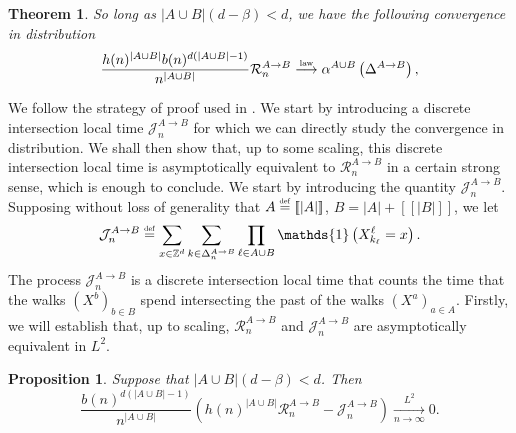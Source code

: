 \documentclass[10pt,a4paper]{amsart}
\newcommand{\R}{\mathcal R}
\newcommand{\J}{\mathcal J}
\newcommand{\1}{\mathds{1}}
\newcommand{\ZZ}{\mathbb Z}
\newcommand{\distribution}{\stackrel{\scaleto{\mathrm{law}}{4pt}}{\longrightarrow}}
\newcommand{\eqdef}{\stackrel{\scaleto{\mathrm{def}}{3.5pt}}{=}}
\newtheorem{theorem}{Theorem}
\newtheorem{proposition}{Proposition}
\numberwithin{equation}{section}
\begin{document}
\begin{theorem}
\label{theorem:convergence of R_n^(A->B)}
    So long as $|A\cup B|(d-\beta)<d$, we have the following convergence in distribution
    \begin{equation}
        \label{convergence:limit of R_n^(A->B)}
        \frac{h(n)^{|A\cup B|}b(n)^{d(|A\cup B|-1)}}{n^{|A\cup B|}}\mathcal R_n^{A\rightarrow B}\distribution \alpha^{A\cup B}\left(\Delta^{A\rightarrow B}\right),
    \end{equation}
\end{theorem}

We follow the strategy of proof used in \cite{LeGallRosenRangeOfStableRandomWalks1991}. We start by introducing a discrete intersection local time $\mathcal J_n^{A\rightarrow B}$ for which we can directly study the convergence in distribution. We shall then show that, up to some scaling, this discrete intersection local time is asymptotically equivalent to $\mathcal R_n^{A\rightarrow B}$ in a certain strong sense, which is enough to conclude. We start by introducing the quantity $\mathcal J_n^{A\rightarrow B}$. Supposing without loss of generality that $A\eqdef[\![|A|]\!]$, $B=|A|+[\![|B|]\!]$, we let
\begin{equation*}
    \mathcal J_n^{A\rightarrow B}\eqdef\sum_{x\in\ZZ^d}\sum_{k\in \Delta_n^{A\rightarrow B}}\prod_{\ell\in A\cup B}\1\left(X_{k_\ell}^{\ell}=x\right).
\end{equation*}
The process $\mathcal J_n^{A\rightarrow B}$ is a discrete intersection local time that counts the time that the walks $(X^b)_{b\in B}$ spend intersecting the past of the walks $(X^a)_{a\in A}$. Firstly, we will establish that, up to scaling, $\R_n^{A\rightarrow B}$ and $\J_n^{A\rightarrow B}$ are asymptotically equivalent in $L^2$.

\begin{proposition}
\label{proposition: h(n)^(a+b)R_n^(A->B) and J_n^(A->B) are close in L^2}
    Suppose that $|A\cup B|(d-\beta)<d$. Then
    \begin{equation*}
        \frac{b(n)^{d(|A\cup B|-1)}}{n^{|A\cup B|}}\left(h(n)^{|A\cup B|}\mathcal R_n^{A\rightarrow B}-\mathcal J_n^{A\rightarrow B}\right)\underset{n\rightarrow\infty}{\overset{L^2}\longrightarrow}0.
    \end{equation*}
\end{proposition}
\end{document}
